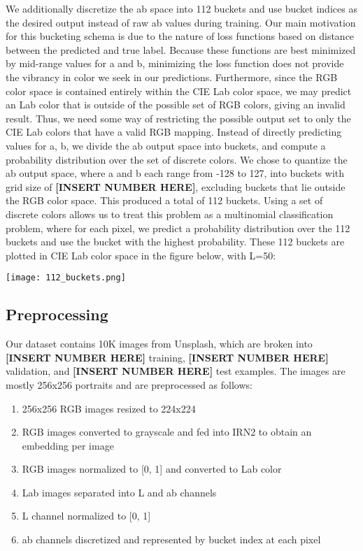 \documentclass{article} %
\begin{document}
We additionally discretize the ab space into 112 buckets and use bucket indices as the desired output instead of raw ab values during training. Our main motivation for this bucketing schema is due to the nature of loss functions based on distance between the predicted and true label. Because these functions are best minimized by mid-range values for a and b, minimizing the loss function does not provide the vibrancy in color we seek in our predictions. Furthermore, since the RGB color space is contained entirely within the CIE Lab color space, we may predict an Lab color that is outside of the possible set of RGB colors, giving an invalid result. Thus, we need some way of restricting the possible output set to only the CIE Lab colors that have a valid RGB mapping. Instead of directly predicting values for a, b, we divide the ab output space into buckets, and compute a probability distribution over the set of discrete colors. We chose to quantize the ab output space, where a and b each range from -128 to 127, into buckets with grid size of \textbf{[INSERT NUMBER HERE]}, excluding buckets that lie outside the RGB color space. This produced a total of 112 buckets. Using a set of discrete colors allows us to treat this problem as a multinomial classification problem, where for each pixel, we predict a probability distribution over the 112 buckets and use the bucket with the highest probability. These 112 buckets are plotted in CIE Lab color space in the figure below, with L=50:

\centerline{\texttt{[image: 112\_buckets.png]}}

\subsection{Preprocessing}

Our dataset contains 10K images from Unsplash\cite{dataset}, which are broken into \textbf{[INSERT NUMBER HERE]} training, \textbf{[INSERT NUMBER HERE]} validation, and \textbf{[INSERT NUMBER HERE]} test examples. The images are mostly 256x256 portraits and are preprocessed as follows:

\begin{enumerate}
\item 256x256 RGB images resized to 224x224
\item RGB images converted to grayscale and fed into IRN2 to obtain an embedding per image
\item RGB images normalized to [0, 1] and converted to Lab color
\item Lab images separated into L and ab channels
\item L channel normalized to [0, 1]
\item ab channels discretized and represented by bucket index at each pixel
\end{enumerate}
\end{document}
